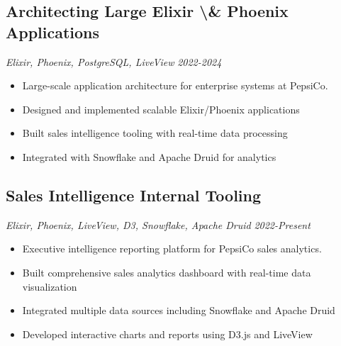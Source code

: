\subsection{\textbf{Architecting Large Elixir \textbackslash{}& Phoenix Applications}}
\textit{Elixir, Phoenix, PostgreSQL, LiveView} \hfill \textit{2022-2024}
\begin{itemize}[leftmargin=*, itemsep=0pt, parsep=0pt, topsep=0pt]
    \item Large-scale application architecture for enterprise systems at PepsiCo.
    \item Designed and implemented scalable Elixir/Phoenix applications
    \item Built sales intelligence tooling with real-time data processing
    \item Integrated with Snowflake and Apache Druid for analytics
\end{itemize}
\vspace{0.5em}

\subsection{\textbf{Sales Intelligence Internal Tooling}}
\textit{Elixir, Phoenix, LiveView, D3, Snowflake, Apache Druid} \hfill \textit{2022-Present}
\begin{itemize}[leftmargin=*, itemsep=0pt, parsep=0pt, topsep=0pt]
    \item Executive intelligence reporting platform for PepsiCo sales analytics.
    \item Built comprehensive sales analytics dashboard with real-time data visualization
    \item Integrated multiple data sources including Snowflake and Apache Druid
    \item Developed interactive charts and reports using D3.js and LiveView
\end{itemize}
\vspace{0.5em}

